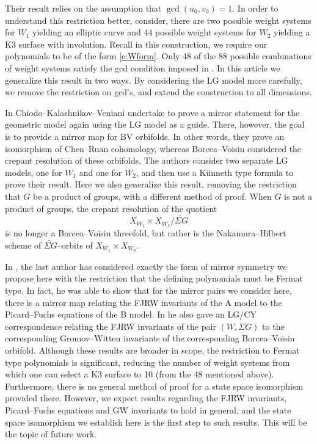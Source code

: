 \documentclass[10pt, letterpaper]{amsart}
\theoremstyle{remark}
\newcommand{\s}[1]{\Sigma #1}
\begin{document}
Their result relies on the assumption that $\gcd(u_0,v_0)=1$. In order to understand this restriction better, consider, there are two possible weight systems for $W_1$ yielding an elliptic curve and 44 possible weight systems for $W_2$ yielding a K3 surface with involution. Recall in this construction, we require our polynomials to be of the form \eqref{e:Wform}. Only 48 of the 88 possible combinations of weight systems satisfy the gcd condition imposed in \cite{ABS}. In this article we generalize this result in two ways. By considering the LG model more carefully, we remove the restriction on gcd's, and extend the construction to all dimensions. 

In \cite{CKV} Chiodo--Kalashnikov--Veniani undertake to prove a mirror statement for the geometric model again using the LG model as a guide. There, however, the goal is to provide a mirror map for BV orbifolds. In other words, they prove an isomorphism of Chen--Ruan cohomology, whereas Borcea--Voisin considered the crepant resolution of these orbifolds. The authors consider two separate LG models, one for $W_1$ and one for $W_2$, and then use a K\"unneth type formula to prove their result. Here we also generalize this result, removing the restriction that $G$ be a product of groups, with a different method of proof. When $G$ is not a product of groups, the crepant resolution of the quotient
\[
X_{W_1}\times X_{W_2}/\widetilde{\s{G}}
\] 
is no longer a Borcea--Voisin threefold, but rather is the Nakamura--Hilbert scheme of $\widetilde{\s{G}}$--orbits of $X_{W_1}\times X_{W_2}$.

In \cite{Schaug}, the last author has considered exactly the form of mirror symmetry we propose here with the restriction that the defining polynomials must be Fermat type. In fact, he was able to show that for the mirror pairs we consider here, there is a mirror map relating the FJRW invariants of the A model to the Picard--Fuchs equations of the B model. In \cite{Schaug2} he also gave an LG/CY correspondence relating the FJRW invariants of the pair $(W,\s{G})$ to the corresponding Gromov--Witten invariants of the corresponding Borcea--Voisin orbifold. Although these results are broader in scope, the restriction to Fermat type polynomials is  significant, reducing the number of weight systems from which one can select a K3 surface to 10 (from the 48 mentioned above). Furthermore, there is no general method of proof for a state space isomorphism provided there. However, we expect results regarding the FJRW invariants, Picard--Fuchs equations and GW invariants to hold in general, and the state space isomorphism we establish here is the first step to such results. This will be the topic of future work. 
\end{document}

